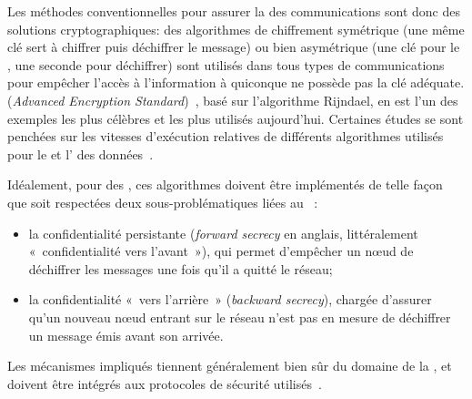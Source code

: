 Les méthodes conventionnelles pour assurer la  des communications sont donc des solutions cryptographiques: des algorithmes de chiffrement symétrique (une même clé sert à chiffrer puis déchiffrer le message) ou bien asymétrique (une clé pour le , une seconde pour déchiffrer) sont utilisés dans tous types de communications pour empêcher l'accès à l'information à quiconque ne possède pas la clé adéquate.
 (\textit{Advanced Encryption Standard})~\cite{aes}, basé sur l'algorithme Rijndael, en est l'un des exemples les plus célèbres et les plus utilisés aujourd'hui.
Certaines études se sont penchées sur les vitesses d'exécution relatives de différents algorithmes utilisés pour le  et l' des données~\cite{SOBMCN11}.

Idéalement, pour des \rcs, ces algorithmes doivent être implémentés de telle façon que soit respectées deux sous-problématiques liées au ~\cite{LG08}:
\begin{itemize}
    \item la confidentialité persistante (\textit{forward secrecy} en anglais, littéralement « confidentialité vers l'avant »), qui permet d'empêcher un nœud de déchiffrer les messages une fois qu'il a quitté le réseau;
    \item la confidentialité « vers l'arrière » (\textit{backward secrecy}), chargée d'assurer qu'un nouveau nœud entrant sur le réseau n'est pas en mesure de déchiffrer un message émis avant son arrivée.
\end{itemize}
Les mécanismes impliqués tiennent généralement bien sûr du domaine de la , et doivent être intégrés aux protocoles de sécurité utilisés~\cite{DSK10}.

